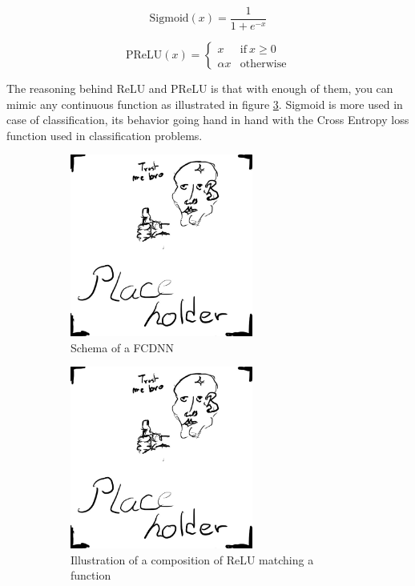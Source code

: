 \begin{minipage}{0.5\linewidth}
  \begin{equation}
    \label{sec:ml:sigmoid}
    \mathrm{Sigmoid}(x) = \frac{1}{1+ e^{-x}}
  \end{equation}
\end{minipage}
\begin{minipage}{0.5\linewidth}
  \begin{equation}
    \label{sec:ml:prelu}
    \mathrm{PReLU}(x) = \begin{cases}
      x & \mathrm{if} ~ x \geq 0 \\
      \alpha x & \mathrm{otherwise}
    \end{cases}
  \end{equation}
\end{minipage}


The reasoning behind ReLU and PReLU is that with enough of them, you can mimic any continuous function as illustrated in figure \ref{fig:ml:relu-mimic}. Sigmoid is more used in case of classification, its behavior going hand in hand with the Cross Entropy loss function used in classification problems.

\begin{figure}[ht]
  \begin{subfigure}[t]{0.48\textwidth}
    \centering
    \includegraphics[height=6cm]{images/placeholder.jpg}
    \caption{Schema of a FCDNN}
    \label{fig:ml:fcdnn}
  \end{subfigure}
  \hfill
  \begin{subfigure}[t]{0.48\textwidth}
    \centering
    \includegraphics[height=6cm]{images/placeholder.jpg}
    \caption{Illustration of a composition of ReLU matching a function}
    \label{fig:ml:relu-mimic}
  \end{subfigure}
  \caption{}
\end{figure}

